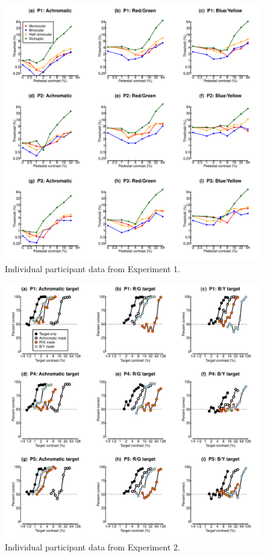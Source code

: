 \documentclass[
]{article}
\begin{document}
\begin{figure}

{\centering \includegraphics{Figures/individualdippers} 

}

\caption{Individual participant data from Experiment 1.}\label{fig:individualdips}
\end{figure}

\begin{figure}

{\centering \includegraphics{Figures/individualMCS} 

}

\caption{Individual participant data from Experiment 2.}\label{fig:individualMCS}
\end{figure}
\end{document}
